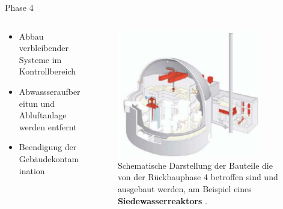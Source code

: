 \begin{frame}{Phase 4}
  \begin{columns}

    \begin{column}{0.48\textwidth}
      \begin{itemize}
        \setlength\itemsep{1.2em}
        \item{ Abbau verbleibender Systeme im Kontrollbereich}
        \item{ Abwassseraufbereitun und Abluftanlage werden entfernt}
        \item{ Beendigung der Gebäudekontamination }
      \end{itemize}
    \end{column}

    \begin{column}{0.48\textwidth}
      \begin{figure}
         \centering
         \includegraphics[width=0.85\textwidth]{./bilder/abbau_schritt_4.PNG}
         \caption{Schematische Darstellung der Bauteile die von der Rückbauphase 4 betroffen sind und ausgebaut werden, am Beispiel eines \textbf{Siedewasserreaktors} \cite{stilllegung_grs}. }
         \label{ fig: phase_4 }
       \end{figure}
    \end{column}

  \end{columns}
\end{frame}



